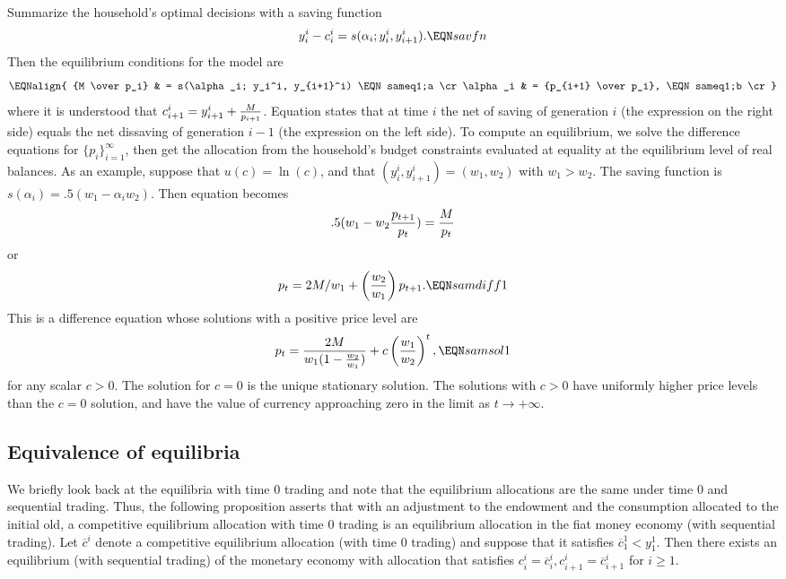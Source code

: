    Summarize the  household's optimal decisions with
a saving function
$$ y_i^i - c_i^i = s(\alpha_i; y_i^i, y_{i+1}^i). \EQN savfn $$
Then the equilibrium conditions for the model are
$$ \EQNalign{ {M  \over p_i} & = s(\alpha_i; y_i^i, y_{i+1}^i) \EQN sameq1;a
                          \cr
                \alpha_i & = {p_{i+1} \over p_i}, \EQN sameq1;b \cr }$$
where it is understood that
$ c_{i+1}^i = y_{i+1}^i + {M \over p_{i+1}} $.
Equation  states that at time $i$  the net of saving of generation $i$ (the expression on the right side) equals
the net dissaving of generation $i-1$ (the expression on the left side).  To compute an equilibrium, we solve the difference equations
 for $\{p_i\}_{i=1}^\infty$,  then get the allocation
from the household's budget constraints evaluated at equality
at the equilibrium level of real balances.
As an example, suppose that $u(c) = \ln(c)$,
and that $(y^i_i, y^i_{i+1}) = (w_1, w_2)$ with $w_1 > w_2$.
  The saving function is
$ s(\alpha_i) = .5(w_1 - \alpha_i w_2)$.   Then
equation  becomes
$$ .5(w_1 - w_2 {p_{t+1} \over p_t}) = {M \over p_t} $$
or
$$ p_t = 2 M/ w_1 + \left({w_2 \over    w_1}\right) p_{t+1} .\EQN samdiff1 $$
This is a difference equation whose solutions
with a positive price level are
$$ p_t = {2 M \over w_1 (1 - {w_2 \over w_1})} + c
  \left({w_1\over w_2}\right)^t, \EQN samsol1 $$
for any scalar $c >0$.
The solution for $c=0$ is the unique stationary solution.  The solutions
with $c >0$ have uniformly higher price levels than the $c=0$ solution,
and have the value of currency approaching  zero in the limit as $t \rightarrow +\infty$.

\subsection{Equivalence of equilibria}
   We briefly look back at the equilibria with
time $0$ trading and note that  the equilibrium allocations are
the same under time $0$ and sequential trading.
Thus, the following proposition
asserts that  with an adjustment to the endowment and the consumption allocated
to the initial old, a competitive equilibrium
allocation with time $0$ trading
is an equilibrium  allocation in the fiat money economy (with
sequential trading).
\medskip
{}  Let $\overline c^i$ denote a competitive equilibrium
 allocation (with time $0$ trading)
  and suppose that it satisfies
$\overline c^1_1 <  y^1_1$.
Then there exists
an equilibrium (with sequential trading) of the monetary economy with
allocation that satisfies $c^i_i = \overline c^i_i, c^i_{i+1} = \overline
c^i_{i+1}$ for $i \geq 1$.

